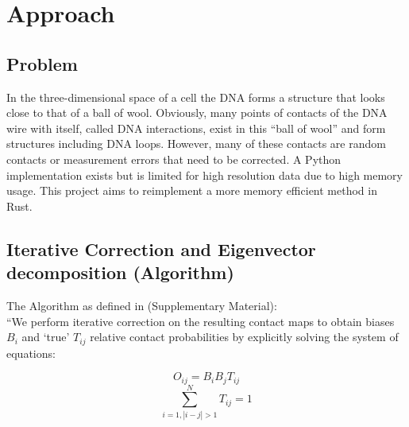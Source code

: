 \chapter{Approach}\label{chap:approach}



\section{Problem}\label{sec:problem}

In the three-dimensional space of a cell the DNA forms a structure that looks
close to that of a ball of wool. Obviously, many points of contacts of the DNA
wire with itself, called DNA interactions, exist in this ``ball of wool'' and
form structures including DNA loops. However, many of these contacts are
random contacts or measurement errors that need to be corrected. A Python
implementation exists but is limited for high resolution data due to high
memory usage. This project aims to reimplement a more memory efficient
method in Rust.






\section{Iterative Correction and Eigenvector decomposition (Algorithm)}\label{sec:ICE}






The Algorithm as defined in \cite{imakaev2012iterative} (Supplementary Material): \\
``We perform iterative correction on the resulting contact maps to obtain
biases $B_i$ and `true' $T_{ij}$ relative contact probabilities by explicitly
solving the system of equations:

$$ O_{ij} = B_i B_j T_{ij} $$
$$ \sum^N_{i=1, |i-j|>1} T_{ij} = 1$$


